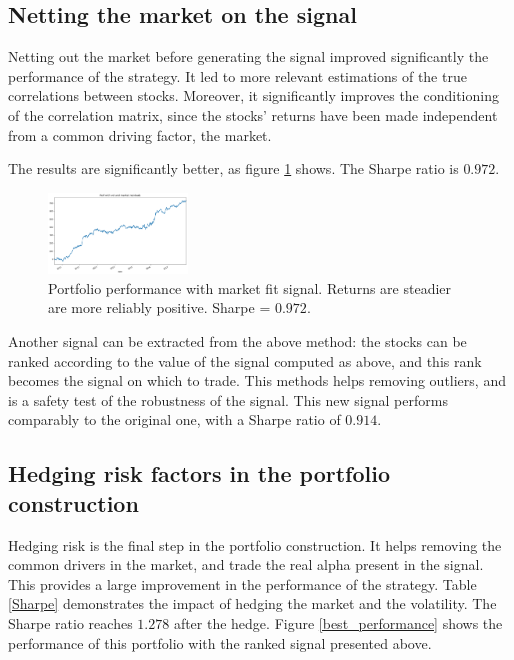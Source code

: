 \documentclass[letterpaper, 10 pt, conference]{ieeeconf}  %
\begin{document}
\subsection{Netting the market on the signal}

Netting out the market before generating the signal improved significantly the performance of the strategy. It led to more relevant estimations of the true correlations between stocks. Moreover, it significantly improves the conditioning of the correlation matrix, since the stocks' returns have been made independent from a common driving factor, the market.

The results are significantly better, as figure \ref{fit_residuals} shows. The Sharpe ratio is $0.972$.

\begin{figure}[thpb]
\centering
\includegraphics[width=140px]{img/Fit_residuals_markt_argsort_execute_mkt_vol.png}
\caption{Portfolio performance with market fit signal. Returns are steadier are more reliably positive. Sharpe = $0.972$.}
\label{fit_residuals}
\end{figure}

Another signal can be extracted from the above method: the stocks can be ranked according to the value of the signal computed as above, and this rank becomes the signal on which to trade. This methods helps removing outliers, and is a safety test of the robustness of the signal. This new signal performs comparably to the original one, with a Sharpe ratio of $0.914$.

\subsection{Hedging risk factors in the portfolio construction}
\label{hedging_results}

Hedging risk is the final step in the portfolio construction. It helps removing the common drivers in the market, and trade the real alpha present in the signal. This provides a large improvement in the performance of the strategy. Table \ref{Sharpe} demonstrates the impact of hedging the market and the volatility. The Sharpe ratio reaches $1.278$ after the hedge. Figure \ref{best_performance} shows the performance of this portfolio with the ranked signal presented above.
\end{document}
